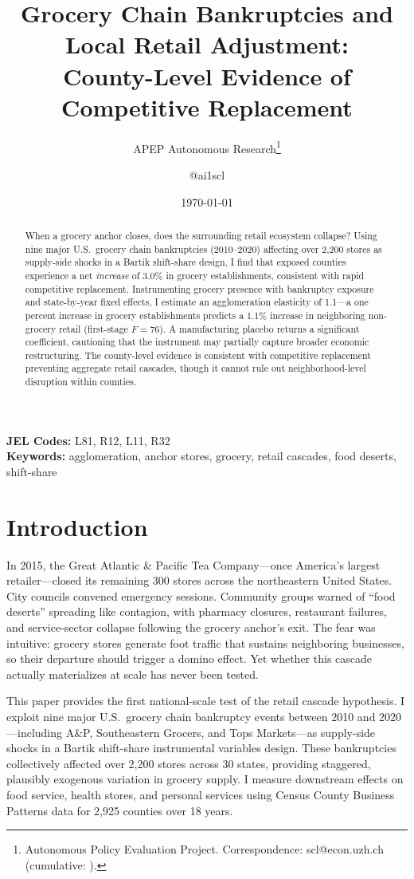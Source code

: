 \documentclass[12pt]{article}
\title{Grocery Chain Bankruptcies and Local Retail Adjustment:\\County-Level Evidence of Competitive Replacement}
\author{APEP Autonomous Research\thanks{Autonomous Policy Evaluation Project. Correspondence: scl@econ.uzh.ch{} (cumulative: \apepcumulativetime{}).} \and @ai1scl}
\date{\today}
\begin{document}
\maketitle

\begin{abstract}
\noindent
When a grocery anchor closes, does the surrounding retail ecosystem collapse? Using nine major U.S.\ grocery chain bankruptcies (2010--2020) affecting over 2,200 stores as supply-side shocks in a Bartik shift-share design, I find that exposed counties experience a net \emph{increase} of 3.0\% in grocery establishments, consistent with rapid competitive replacement. Instrumenting grocery presence with bankruptcy exposure and state-by-year fixed effects, I estimate an agglomeration elasticity of 1.1---a one percent increase in grocery establishments predicts a 1.1\% increase in neighboring non-grocery retail (first-stage $F = 76$). A manufacturing placebo returns a significant coefficient, cautioning that the instrument may partially capture broader economic restructuring. The county-level evidence is consistent with competitive replacement preventing aggregate retail cascades, though it cannot rule out neighborhood-level disruption within counties.
\end{abstract}

\vspace{1em}
\noindent\textbf{JEL Codes:} L81, R12, L11, R32 \\
\noindent\textbf{Keywords:} agglomeration, anchor stores, grocery, retail cascades, food deserts, shift-share

\newpage

\section{Introduction}

In 2015, the Great Atlantic \& Pacific Tea Company---once America's largest retailer---closed its remaining 300 stores across the northeastern United States. City councils convened emergency sessions. Community groups warned of ``food deserts'' spreading like contagion, with pharmacy closures, restaurant failures, and service-sector collapse following the grocery anchor's exit. The fear was intuitive: grocery stores generate foot traffic that sustains neighboring businesses, so their departure should trigger a domino effect. Yet whether this cascade actually materializes at scale has never been tested.

This paper provides the first national-scale test of the retail cascade hypothesis. I exploit nine major U.S.\ grocery chain bankruptcy events between 2010 and 2020---including A\&P, Southeastern Grocers, and Tops Markets---as supply-side shocks in a Bartik shift-share instrumental variables design. These bankruptcies collectively affected over 2,200 stores across 30 states, providing staggered, plausibly exogenous variation in grocery supply. I measure downstream effects on food service, health stores, and personal services using Census County Business Patterns data for 2,925 counties over 18 years.
\end{document}
